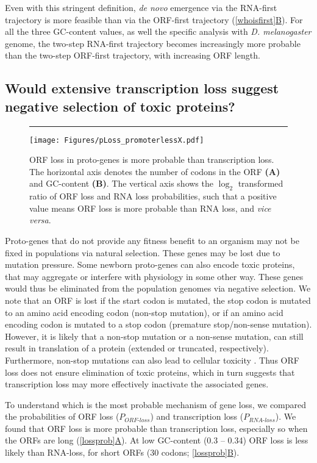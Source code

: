 \documentclass[12pt,a4paper]{article}
\newcommand{\cmnt}[1]{{\color{purple} #1}}
\begin{document}
\cmnt{Even with this stringent definition, \textit{de novo} emergence via the RNA-first trajectory is more feasible than via the ORF-first trajectory (\hyperref[whoisfirst]{\autoref{whoisfirst}B}). For all the three GC-content values, as well the specific analysis with \textit{D. melanogaster} genome, the two-step RNA-first trajectory becomes increasingly more probable than the two-step ORF-first trajectory, with increasing ORF length.}


\subsection{Would extensive transcription loss suggest negative selection of toxic proteins?}


\begin{figure}[!b]
\centering
\hrule
\vspace{1ex}
\texttt{[image: Figures/pLoss\_promoterlessX.pdf]}
\caption{ORF loss in proto-genes is more probable than transcription loss. The horizontal axis denotes the number of codons in the ORF \textbf{(A)} and GC-content \textbf{(B)}. The vertical axis shows the $\log_2$ transformed ratio of ORF loss and RNA loss probabilities, such that a positive value means ORF loss is more probable than RNA loss, and \textit{vice versa}.}
\label{lossprob}
\end{figure}

Proto-genes that do not provide any fitness benefit to an organism may not be fixed in populations via natural selection. These genes may be lost due to mutation pressure. Some newborn proto-genes can also encode toxic proteins, that may aggregate or interfere with physiology in some other way. These genes would thus be eliminated from the population genomes via negative selection. We note that an ORF is lost if the start codon is mutated, the stop codon is mutated to an amino acid encoding codon (non-stop mutation), or if an amino acid encoding codon is mutated to a stop codon (premature stop/non-sense mutation). However, it is likely that a non-stop mutation or a non-sense mutation, can still result in translation of a protein (extended or truncated, respectively). Furthermore, non-stop mutations can also lead to cellular toxicity \citep{nonstop}. Thus ORF loss does not ensure elimination of toxic proteins, which in turn suggests that transcription loss may more effectively inactivate the associated genes.

To understand which is the most probable mechanism of gene loss, we compared the probabilities of ORF loss ($P_\textit{ORF-loss}$) and transcription loss ($P_\textit{RNA-loss}$). We found that ORF loss is more probable than transcription loss, especially so when the ORFs are long (\hyperref[lossprob]{\autoref{lossprob}A}). At low GC-content (0.3 -- 0.34) ORF loss is less likely than RNA-loss, for short ORFs (30 codons; \hyperref[lossprob]{\autoref{lossprob}B}).
\end{document}
